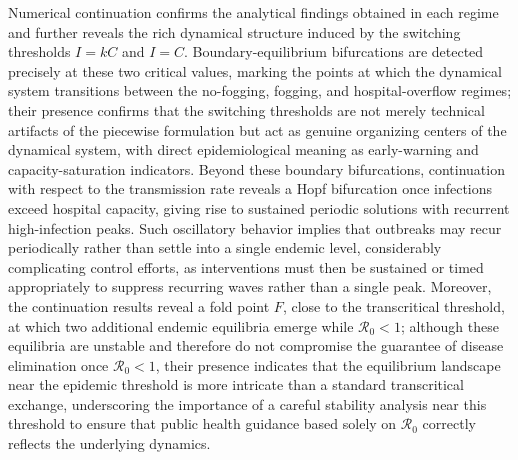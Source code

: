 \documentclass[preprint]{elsarticle}
\begin{document}
 Numerical continuation confirms the analytical findings obtained in each regime and further reveals the rich dynamical structure induced by the switching thresholds $I=kC$ and $I=C$. Boundary-equilibrium bifurcations are detected precisely at these two critical values, marking the points at which the dynamical system transitions between the no-fogging, fogging, and hospital-overflow regimes; their presence confirms that the switching thresholds are not merely technical artifacts of the piecewise formulation but act as genuine organizing centers of the dynamical system, with direct epidemiological meaning as early-warning and capacity-saturation indicators. Beyond these boundary bifurcations, continuation with respect to the transmission rate reveals a Hopf bifurcation once infections exceed hospital capacity, giving rise to sustained periodic solutions with recurrent high-infection peaks. Such oscillatory behavior implies that outbreaks may recur periodically rather than settle into a single endemic level, considerably complicating control efforts, as interventions must then be sustained or timed appropriately to suppress recurring waves rather than a single peak. Moreover, the continuation results reveal a fold point $F$, close to the transcritical threshold, at which two additional endemic equilibria emerge while $\mathcal{R}_0<1$; although these equilibria are unstable and therefore do not compromise the guarantee of disease elimination once $\mathcal{R}_0<1$, their presence indicates that the equilibrium landscape near the epidemic threshold is more intricate than a standard transcritical exchange, underscoring the importance of a careful stability analysis near this threshold to ensure that public health guidance based solely on $\mathcal{R}_0$ correctly reflects the underlying dynamics.
\end{document}
